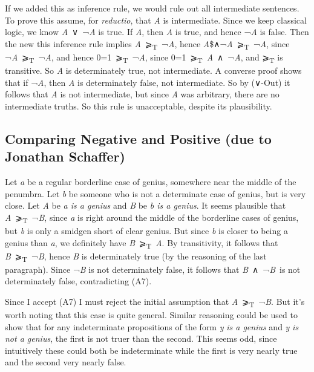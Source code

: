 \documentclass[
  10pt,
  letterpaper,
  DIV=11,
  numbers=noendperiod,
  twoside]{scrartcl}
\begin{document}
If we added this as inference rule, we would rule out all intermediate
sentences. To prove this assume, for \emph{reductio}, that \emph{A} is
intermediate. Since we keep classical logic, we know
\emph{A}~∨~¬\emph{A} is true. If \emph{A}, then \emph{A} is true, and
hence ¬\emph{A} is false. Then the new this inference rule implies
\emph{A}~⩾\textsubscript{T}~¬\emph{A}, hence
\emph{A}\$∧¬\emph{A}~⩾\textsubscript{T}~¬\emph{A}, since
¬\emph{A}~⩾\textsubscript{T}~¬\emph{A}, and hence
0=1~⩾\textsubscript{T}~¬\emph{A}, since
0=1~⩾\textsubscript{T}~\emph{A}~∧~¬\emph{A}, and ⩾\textsubscript{T} is
transitive. So \emph{A} is determinately true, not intermediate. A
converse proof shows that if ¬\emph{A}, then \emph{A} is determinately
false, not intermediate. So by (∨-Out) it follows that \emph{A} is not
intermediate, but since \emph{A} was arbitrary, there are no
intermediate truths. So this rule is unacceptable, despite its
plausibility.

\subsection*{Comparing Negative and Positive (due to Jonathan
Schaffer)}\label{comparing-negative-and-positive-due-to-jonathan-schaffer}

Let \emph{a} be a regular borderline case of genius, somewhere near the
middle of the penumbra. Let \emph{b} be someone who is not a determinate
case of genius, but is very close. Let \emph{A} be \emph{a is a genius}
and \emph{B} be \emph{b is a genius}. It seems plausible that
\emph{A}~⩾\textsubscript{T}~¬\emph{B}, since \emph{a} is right around
the middle of the borderline cases of genius, but \emph{b} is only a
smidgen short of clear genius. But since \emph{b} is closer to being a
genius than \emph{a}, we definitely have
\emph{B}~⩾\textsubscript{T}~\emph{A}. By transitivity, it follows that
\emph{B}~⩾\textsubscript{T}~¬\emph{B}, hence \emph{B} is determinately
true (by the reasoning of the last paragraph). Since ¬\emph{B} is not
determinately false, it follows that \emph{B}~∧~¬\emph{B}~is not
determinately false, contradicting (A7).

Since I accept (A7) I must reject the initial assumption that
\emph{A}~⩾\textsubscript{T}~¬\emph{B}. But it's worth noting that this
case is quite general. Similar reasoning could be used to show that for
any indeterminate propositions of the form \emph{y} \emph{is a genius}
and \emph{y} \emph{is not a genius}, the first is not truer than the
second. This seems odd, since intuitively these could both be
indeterminate while the first is very nearly true and the second very
nearly false.
\end{document}
